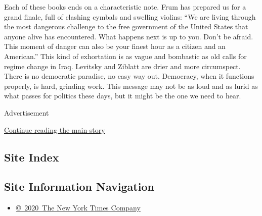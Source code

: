 Each of these books ends on a characteristic note. Frum has prepared us
for a grand finale, full of clashing cymbals and swelling violins: ``We
are living through the most dangerous challenge to the free government
of the United States that anyone alive has encountered. What happens
next is up to you. Don't be afraid. This moment of danger can also be
your finest hour as a citizen and an American.'' This kind of
exhortation is as vague and bombastic as old calls for regime change in
Iraq. Levitsky and Ziblatt are drier and more circumspect. There is no
democratic paradise, no easy way out. Democracy, when it functions
properly, is hard, grinding work. This message may not be as loud and as
lurid as what passes for politics these days, but it might be the one we
need to hear.

Advertisement

\protect\hyperlink{after-bottom}{Continue reading the main story}

\hypertarget{site-index}{%
\subsection{Site Index}\label{site-index}}

\hypertarget{site-information-navigation}{%
\subsection{Site Information
Navigation}\label{site-information-navigation}}

\begin{itemize}
\tightlist
\item
  \href{https://help.nytimes3xbfgragh.onion/hc/en-us/articles/115014792127-Copyright-notice}{©~2020~The
  New York Times Company}
\end{itemize}

